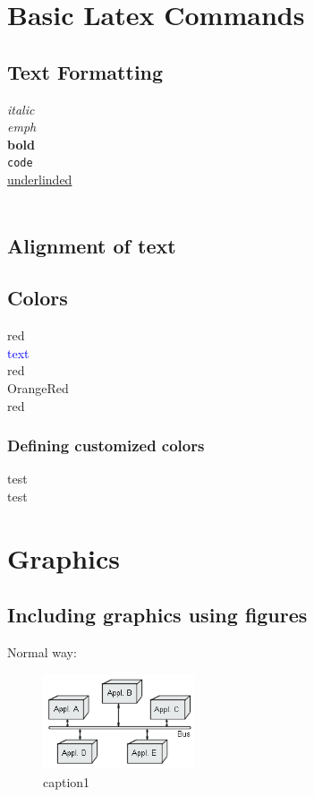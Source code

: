 \documentclass[12pt]{article}
\begin{document}
\section{Basic Latex Commands}
\subsection{Text Formatting}
\textit{italic} \\
\emph{emph} \\
\textbf{bold} \\
\texttt{code} \\
\underline{underlinded} \\
 \\
\subsection{Alignment of text}

\subsection{Colors}
\color{red} 
red \\
\textcolor{blue}{text} \\
red \\
\color{OrangeRed} OrangeRed \\
\color{black} red \\
\subsubsection{Defining customized colors}
\color{rgb} test \\
\color{dark-gray} test
\color{black} 
\newpage
\section{Graphics}
\listoffigures
\subsection{Including graphics using figures}
Normal way: \\
\begin{figure}[here!]
\centering
\includegraphics[width=0.4\textwidth]{images/eai2.png}
\caption{caption1}
\label{itm:eai}
\end{figure}
\end{document}
